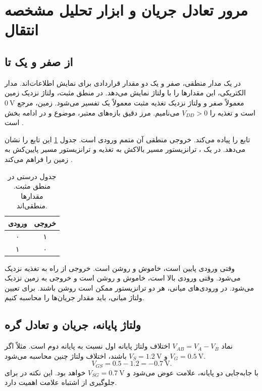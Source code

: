 \chapter*{مرور تعادل جریان و ابزار تحلیل مشخصه انتقال}
\section*{از صفر و یک تا }
در یک مدار منطقی، صفر و یک دو مقدار قراردادی برای نمایش اطلاعات‌اند.
مدار الکتریکی، این مقدارها را با ولتاژ نمایش می‌دهد. در منطق مثبت،
ولتاژ نزدیک زمین معمولاً صفر و ولتاژ نزدیک تغذیه مثبت معمولاً یک
تفسیر می‌شود. زمین، مرجع \(\qty{0}{\volt}\) است و تغذیه را
\(V_{DD}>0\) می‌نامیم. مرز دقیق بازه‌های معتبر، موضوع
 و  در ادامه بخش 
است \cite[مقدمه بخش  و اسلاید ۳]{weste,dcslides}.

 تابع  را پیاده می‌کند. خروجی منطقی آن
متمم ورودی است. جدول \ref{tab:inverter-truth} این تابع را نشان
می‌دهد. در یک ، ترانزیستور  مسیر
بالاکش به تغذیه و ترانزیستور  مسیر پایین‌کش به زمین را
فراهم می‌کند \cite[شکل ]{weste}.
\begin{table}[!htbp]
\centering
\caption{جدول درستی  در منطق مثبت. مقدارها منطقی‌اند.}
\label{tab:inverter-truth}
\begin{tabular}{cc}
\toprule
ورودی & خروجی\\
\midrule
۰ & ۱\\
۱ & ۰\\
\bottomrule
\end{tabular}
\end{table}

وقتی ورودی پایین است،  خاموش و  روشن است.
خروجی از راه  به تغذیه نزدیک می‌شود. وقتی ورودی بالا
است،  خاموش و  روشن است و خروجی به زمین نزدیک
می‌شود. در ورودی‌های میانی، هر دو ترانزیستور ممکن است روشن باشند.
برای تعیین ولتاژ میانی، باید مقدار جریان‌ها را محاسبه کنیم.

\section*{ولتاژ پایانه، جریان و تعادل گره}
نماد \(V_{AB}=V_A-V_B\) اختلاف ولتاژ پایانه اول نسبت به پایانه
دوم است. مثلاً اگر \(V_G=\qty{0.5}{\volt}\) و
\(V_S=\qty{1.2}{\volt}\) باشند، اختلاف ولتاژ چنین محاسبه می‌شود.
\[
 V_{GS}=0.5-1.2=-\qty{0.7}{\volt}.
\]
با جابه‌جایی دو
پایانه، علامت عوض می‌شود و \(V_{SG}=\qty{0.7}{\volt}\) خواهد بود.
این نکته در  برای جلوگیری از اشتباه علامت اهمیت دارد.

